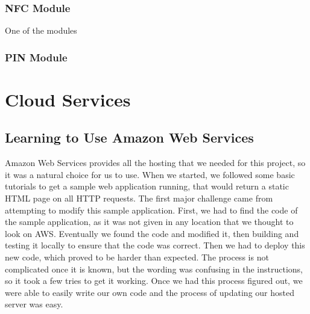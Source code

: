 \documentclass[12pt]{report}
\let\Oldsection\section
\renewcommand{\section}{\FloatBarrier\Oldsection}
\let\Oldsubsection\subsection
\renewcommand{\subsection}{\FloatBarrier\Oldsubsection}
\let\Oldsubsubsection\subsubsection
\renewcommand{\subsubsection}{\FloatBarrier\Oldsubsubsection}
\begin{document}
\subsubsection{NFC Module} \label{nfc-modules}

One of the modules 

\subsubsection{PIN Module} \label{pin-modules}




\section{Cloud Services} \label{cloud-services}



\subsection{Learning to Use Amazon Web Services} \label{learning-to-use-amazon-web-services}

Amazon Web Services provides all the hosting that we needed for this project, so it was a
natural choice for us to use. When we started, we followed some basic tutorials to get a sample
web application running, that would return a static HTML page on all HTTP requests. The first
major challenge came from attempting to modify this sample application. First, we had to find
the code of the sample application, as it was not given in any location that we thought to look on
AWS. Eventually we found the code and modified it, then building and testing it locally to
ensure that the code was correct. Then we had to deploy this new code, which proved to be
harder than expected. The process is not complicated once it is known, but the wording was
confusing in the instructions, so it took a few tries to get it working. Once we had this process
figured out, we were able to easily write our own code and the process of updating our hosted
server was easy.
\end{document}
